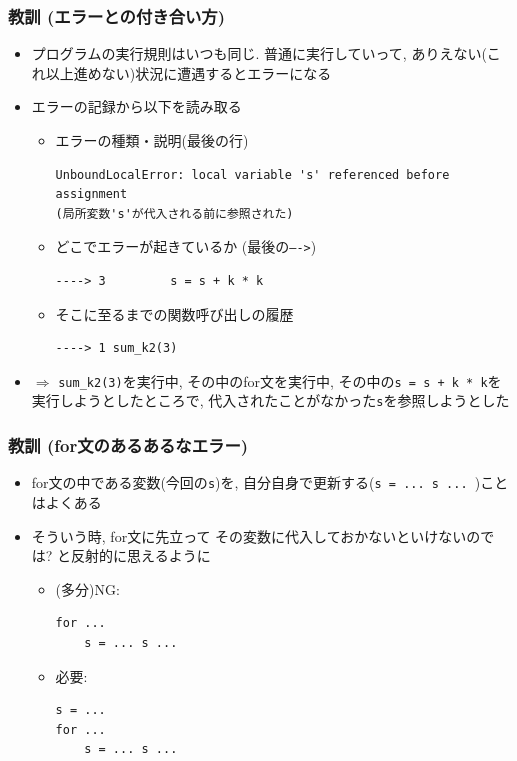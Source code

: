 \documentclass[10pt,dvipdfmx]{beamer}
\newcommand{\ao}[1]{{\color{blue}#1}}
\newcommand{\aka}[1]{{\color{red}#1}}
\begin{document}
\begin{frame}[fragile]
  \frametitle{教訓 (エラーとの付き合い方)}
  \begin{itemize}
  \item \ao{プログラムの実行規則はいつも同じ.} 普通に実行していって,
    ありえない(これ以上進めない)状況に遭遇するとエラーになる
  \item エラーの記録から以下を読み取る
    \begin{itemize}
    \item エラーの種類・説明(最後の行)
\begin{lstlisting}[basicstyle=\ttfamily\scriptsize]
UnboundLocalError: local variable 's' referenced before assignment
(局所変数's'が代入される前に参照された)
\end{lstlisting}
    \item どこでエラーが起きているか (最後の{\tt ---->})
\begin{lstlisting}
----> 3         s = s + k * k        
\end{lstlisting}
    \item そこに至るまでの関数呼び出しの履歴
\begin{lstlisting}
----> 1 sum_k2(3)      
\end{lstlisting}
\end{itemize}
\item $\Rightarrow$ {\tt sum\_k2(3)}を実行中, その中のfor文を実行中,
  その中の{\tt s = s + k * k}を実行しようとしたところで,
  代入されたことがなかった{\tt s}を参照しようとした
\end{itemize}
\end{frame}

\begin{frame}[fragile]
  \frametitle{教訓 (for文のあるあるなエラー)}
  \begin{itemize}
  \item for文の中である変数(今回の{\tt s})を,
    自分自身で更新する({\tt s = ... s ... })ことはよくある
  \item そういう時, \aka{for文に先立って}
    その変数に代入しておかないといけないのでは?
    と反射的に思えるように
    \begin{itemize}
\item (多分)NG:
\begin{lstlisting}
for ...
    s = ... s ...  
\end{lstlisting}
\item 必要:
\begin{lstlisting}
s = ...    
for ...
    s = ... s ...  
\end{lstlisting}
\end{itemize}
\end{itemize}
\end{frame}
\end{document}
